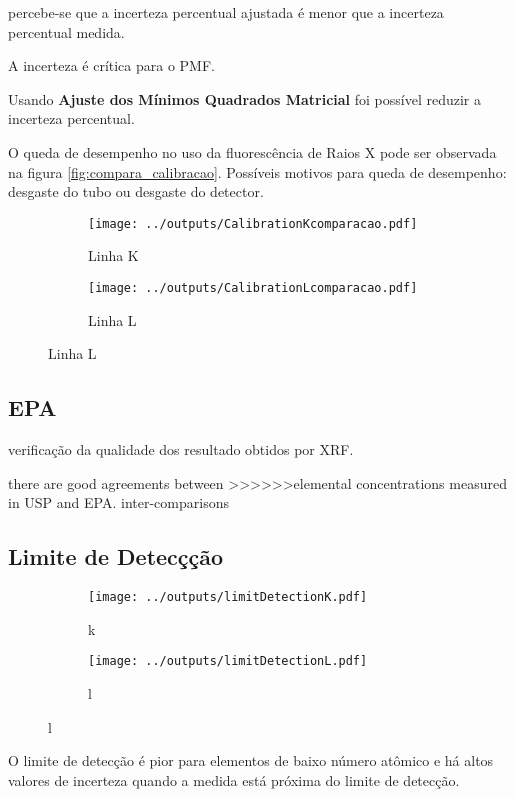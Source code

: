 percebe-se que a incerteza percentual ajustada é menor que 
a incerteza percentual medida. 

A incerteza é crítica para o PMF. 

Usando \textbf{Ajuste dos Mínimos Quadrados Matricial} foi possível
reduzir a incerteza percentual. 



O queda de desempenho no uso da fluorescência de Raios X pode ser observada 
na figura \ref{fig:compara_calibracao}. 
Possíveis motivos para queda de desempenho: desgaste do tubo ou desgaste do detector. 

\begin{figure}[H]
  \caption{Calibrações de Fluorescência de Raiox X em 3 períodos \label{fig:compara_calibracao}}
  \begin{subfigure}[b]{0.5\textwidth}
    \texttt{[image: ../outputs/CalibrationKcomparacao.pdf]}
    \caption{Linha K}
  \end{subfigure}%
  \begin{subfigure}[b]{0.5\textwidth}
    \texttt{[image: ../outputs/CalibrationLcomparacao.pdf]}
    \caption{Linha L}
  \end{subfigure}
\end{figure}

\subsection{EPA}

verificação da qualidade dos resultado obtidos por XRF.

there are good agreements between
>>>>>>elemental concentrations measured in USP and EPA. 
inter-comparisons

\subsection{Limite de Detecçção}



\begin{figure}[H]
  \caption{}
  \begin{subfigure}[b]{0.5\textwidth}
    \texttt{[image: ../outputs/limitDetectionK.pdf]}
    \caption{k}
  \end{subfigure}%
  \begin{subfigure}[b]{0.5\textwidth}
    \texttt{[image: ../outputs/limitDetectionL.pdf]}
    \caption{l}
  \end{subfigure}
\end{figure}

O limite de detecção é pior para elementos de baixo número atômico e há
altos valores de incerteza quando a medida está próxima do limite de detecção.
